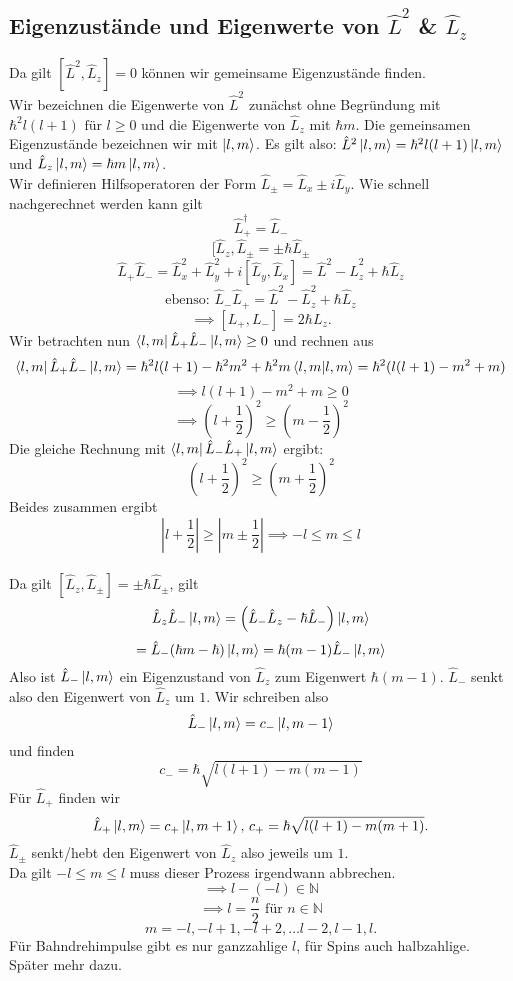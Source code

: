 \documentclass{report}
\begin{document}
\subsection{Eigenzustände und Eigenwerte von $\hat{L}^2$ \& $\hat{L}_z$ }
Da gilt $[\hat{L}^2, \hat{L}_z] = 0$ können wir gemeinsame Eigenzustände finden.\\
Wir bezeichnen die Eigenwerte von $\hat{L}^2$ zunächst ohne Begründung mit $\hbar^2 l(l+1) \text{ für } l \ge 0$ und die Eigenwerte von $\hat{L}_z$ mit $\hbar m$. Die gemeinsamen Eigenzustände bezeichnen wir mit $\ket{l,m} $.
Es gilt also: $\hat{L}^2 \ket{l,m} = \hbar^2 l (l+1) \ket{l,m} $ und $\hat{L}_z \ket{l,m}  = \hbar m \ket{l,m} $. \\
Wir definieren Hilfsoperatoren der Form $\hat{L}_{\pm} = \hat{L}_x \pm i \hat{L}_y$. Wie schnell nachgerechnet werden kann gilt \[
\hat{L}_+^\dagger = \hat{L}_-
\] \[
[\hat{L}_z, \hat{L}_{\pm} = \pm \hbar \hat{L}_{\pm} 
\] \[
\hat{L}_+\hat{L}_- = \hat{L}_x^2 + \hat{L}_y^2 + i[\hat{L}_y, \hat{L}_x] = \hat{L}^2 - \hat{L}_z^2+ \hbar\hat{L}_z 
\] \[
\text{ebenso: } \hat{L}_-\hat{L}_+ = \hat{L}^2 - \hat{L}_z^2 + \hbar \hat{L}_z
\] \[
\implies [L_+, L_-] = 2 \hbar L_z
.\] Wir betrachten nun $\bra{l,m} \hat{L}_+\hat{L}_- \ket{l,m} \ge 0 $  und rechnen aus \[
\bra{l,m} \hat{L}_+\hat{L}_- \ket{l,m} = \hbar^2 l(l+1) -\hbar^2m^2 + \hbar^2m \bra{l,m} \ket{l,m} = \hbar^2 (l(l+1) -m^2 + m)
\] \[
\implies l(l+1) - m^2 + m \ge 0
\] \[
\implies \left( l + \frac{1}{2} \right) ^2 \ge \left( m- \frac{1}{2} \right) ^2
\] Die gleiche Rechnung mit $\bra{l,m} \hat{L}_-\hat{L}_+ \ket{l,m} $ ergibt: \[
\left( l + \frac{1}{2} \right) ^2 \ge \left( m + \frac{1}{2} \right) ^2
\] Beides zusammen ergibt \[
|l + \frac{1}{2}| \ge |m \pm \frac{1}{2}| \implies -l \le m \le l
\] \\
Da gilt $[\hat{L}_z, \hat{L}_{\pm}] = \pm \hbar \hat{L}_{\pm}$, gilt \[
	\hat{L}_z\hat{L}_- \ket{l,m} = \left( \hat{L}_- \hat{L}_z - \hbar \hat{L}_- \right) \ket{l,m} 
\] \[
= \hat{L}_- (\hbar m - \hbar) \ket{l,m} = \hbar(m-1) \hat{L}_- \ket{l,m} 
\] Also ist $\hat{L}_- \ket{l,m} $ ein Eigenzustand von $\hat{L}_z$ zum Eigenwert $\hbar(m-1)$. $\hat{L}_-$ senkt also den Eigenwert von $\hat{L}_z$ um $1$. Wir schreiben also \[
\hat{L}_- \ket{l,m} = c_- \ket{l,m-1} 
\] und finden \[
c_- = \hbar \sqrt{l(l+1) - m (m-1)} 
\] Für $\hat{L}_+$ finden wir \[
\hat{L}_+ \ket{l,m} = c_+ \ket{l,m+1} \text{, } c_+ = \hbar \sqrt{l(l+1) - m(m+1)} 
.\] $\hat{L}_{\pm}$ senkt/hebt den Eigenwert von $\hat{L}_z$ also jeweils um $1$. \\
Da gilt $-l \le m \le l$ muss dieser Prozess irgendwann abbrechen. \[
	\implies l - (-l) \in \mathbb{N}
\]\[
\implies l = \frac{n}{2} \text{ für } n \in \mathbb{N}
\] \[
m = -l, -l+1, -l+2, \ldots l-2, l-1, l
.\] Für Bahndrehimpulse gibt es nur ganzzahlige $l$, für Spins auch halbzahlige. Später mehr dazu.
\end{document}
